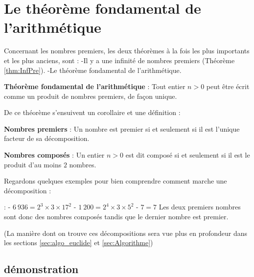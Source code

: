 \section{Le théorème fondamental de l'arithmétique}

Concernant les nombres premiers, les deux théorèmes à la fois les plus importants et les plus anciens, sont : \newline
-Il y a une infinité de nombres premiers (Théorème \ref{thm:InfPre}). \newline
-Le théorème fondamental de l'arithmétique.

\begin{theorem}
\textbf{Théorème fondamental de l'arithmétique} : \newline
Tout entier $n > 0$ peut être écrit comme un produit de nombres premiers, de façon unique.
\end{theorem}

De ce théorème s'ensuivent un corollaire et une définition :

\begin{corollary}
\textbf{Nombres premiers} : \newline
Un nombre est premier si et seulement si il est l'unique facteur de sa décomposition.
\end{corollary}

\begin{definition}
\textbf{Nombres composés} : \newline
Un entier $n > 0$ est dit composé si et seulement si il est le produit d'au moins $2$ nombres.
\end{definition}

Regardons quelques exemples pour bien comprendre comment marche une décomposition : 

\begin{example}
: \newline
- $6 \ 936 = 2^{3} \times 3 \times 17^{2}$ \newline
- $1 \ 200 = 2^{4} \times 3 \times 5^{2}$ \newline
- $7 = 7$ \newline
Les deux premiers nombres sont donc des nombres composés tandis que le dernier nombre est premier.
\end{example}

(La manière dont on trouve ces décompositions sera vue plus en profondeur dans les sections \ref{sec:algo_euclide} et \ref{sec:Algorithme})


\subsection{démonstration}

